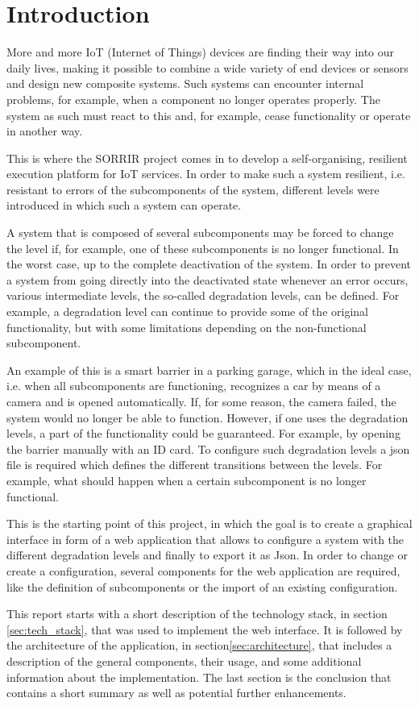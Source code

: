 \section{Introduction}
\label{sec:intro}

More and more IoT (Internet of Things) devices are finding their way into our daily lives, making it possible to combine a wide variety of end devices or sensors and design new composite systems. 
Such systems can encounter internal problems, for example, when a component no longer operates properly. The system as such must react to this and, for example, cease functionality or operate in another way.

This is where the SORRIR project comes in to develop a self-organising, resilient execution platform for IoT services. In order to make such a system resilient, i.e. resistant to errors of the subcomponents of the system, different levels were introduced in which such a system can operate. 

A system that is composed of several subcomponents may be forced to change the level if, for example, one of these subcomponents is no longer functional. In the worst case, up to the complete deactivation of the system. In order to prevent a system from going directly into the deactivated state whenever an error occurs, various intermediate levels, the so-called degradation levels, can be defined. For example, a degradation level can continue to provide some of the original functionality, but with some limitations depending on the non-functional subcomponent.

An example of this is a smart barrier in a parking garage, which in the ideal case, i.e. when all subcomponents are functioning, recognizes a car by means of a camera and is opened automatically. If, for some reason, the camera failed, the system would no longer be able to function. However, if one uses the degradation levels, a part of the functionality could be guaranteed. For example, by opening the barrier manually with an ID card. To configure such degradation levels a json file is required which defines the different transitions between the levels. For example, what should happen when a certain subcomponent is no longer functional.

This is the starting point of this project, in which the goal is to create a graphical interface in form of a web application that allows to configure a system with the different degradation levels and finally to export it as Json. In order to change or create a configuration, several components for the web application are required, like the definition of subcomponents or the import of an existing configuration. 

This report starts with a short description of the technology stack, in section \ref{sec:tech_stack}, that was used to implement the web interface. It is followed by the architecture of the application, in section\ref{sec:architecture}, that includes a description of the general components, their usage, and some additional information about the implementation. The last section is the conclusion that contains a short summary as well as potential further enhancements.

\newpage